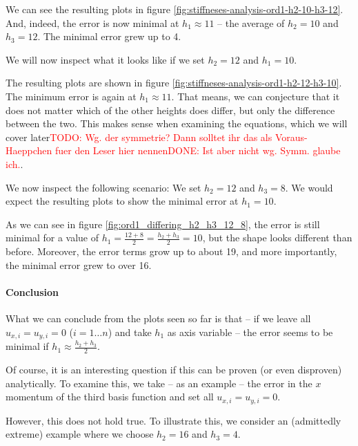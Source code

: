\documentclass{article}
\newcommand{\todo}[2][]{\textcolor{red}{TODO\ifthenelse{\equal{#1}{}}{}{[#1]}: #2}}
\newcommand{\done}[2][]{\textcolor{green!50!black}{DONE\ifthenelse{\equal{#1}{}}{}{[#1]}: #2}}
\begin{document}
We can see the resulting plots in figure \ref{fig:stiffneses-analysis-ord1-h2-10-h3-12}. And, indeed, the error is now minimal at $h_1\approx 11$ -- the average of $h_2=10$ and $h_3=12$. The minimal error grew up to 4.

We will now inspect what it looks like if we set $h_2=12$ and $h_1=10$.



The resulting plots are shown in figure \ref{fig:stiffneses-analysis-ord1-h2-12-h3-10}. The minimum error is again at $h_1\approx 11$. That means, we can conjecture that it does not matter which of the other heights does differ, but only the difference between the two. This makes sense when examining the equations, which we will cover later\todo{Wg. der symmetrie? Dann solltet ihr das als Voraus-Haeppchen fuer den Leser hier nennen\done{Ist aber nicht wg. Symm. glaube ich.}}.

We now inspect the following scenario: We set $h_2=12$ and $h_3=8$. We would expect the resulting plots to show the minimal error at $h_1=10$.



As we can see in figure \ref{fig:ord1_differing_h2_h3_12_8}, the error is still minimal for a value of $h_1=\frac{12+8}{2}=\frac{h_2+h_3}{2}=10$, but the shape looks different than before. Moreover, the error terms grow up to about 19, and more importantly, the minimal error grew to over 16.

\paragraph{Conclusion}


What we can conclude from the plots seen so far is that -- if we leave all $u_{x,i}=u_{y,i}=0$ ($i=1\dots n$) and take $h_1$ as axis variable -- the error seems to be minimal if $h_1\approx \frac{h_2+h_3}{2}$.

Of course, it is an interesting question if this can be proven (or even disproven) analytically. To examine this, we take -- as an example -- the error in the $x$ momentum of the third basis function and set all $u_{x,i}=u_{y,i}=0$.

However, this does not hold true.
To illustrate this, we consider an (admittedly extreme) example where we choose $h_2=16$ and $h_3=4$.
\end{document}
